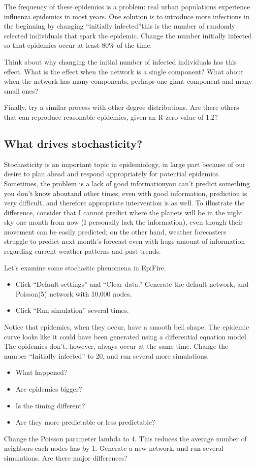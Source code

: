 \documentclass{article}
\begin{document}
The frequency of these epidemics is a problem: real urban populations experience influenza epidemics in most years.  One solution is to introduce more infections in the beginning by changing ``initially infected''\textemdash this is the number of randomly selected individuals that spark the epidemic.  Change the number initially infected so that epidemics occur at least 80\% of the time.

Think about why changing the initial number of infected individuals has this effect.  What is the effect when the network is a single component?  What about when the network has many components, perhaps one giant component and many small ones?

Finally, try a similar process with other degree distributions.  Are there others that can reproduce reasonable epidemics, given an R-zero value of 1.2?


\subsection{What drives stochasticity?}
Stochasticity is an important topic in epidemiology, in large part because of our desire to plan ahead and respond appropriately for potential epidemics.  Sometimes, the problem is a lack of good information\textemdash you can't predict something you don't know about\textemdash and other times, even with good information, prediction is very difficult, and therefore appropriate intervention is as well.  To illustrate the difference, consider that I cannot predict where the planets will be in the night sky one month from now (I personally lack the information), even though their movement can be easily predicted; on the other hand, weather forecasters struggle to predict next month's forecast even with huge amount of information regarding current weather patterns and past trends.

Let's examine some stochastic phenomena in EpiFire.
\begin{itemize}
 \item Click ``Default settings'' and ``Clear data.''  Generate the default network, and Poisson(5) network with 10,000 nodes.
 \item Click ``Run simulation'' several times.
\end{itemize}

Notice that epidemics, when they occur, have a smooth bell shape.  The epidemic curve looks like it could have been generated using a differential equation model. The epidemics don't, however, always occur at the same time. Change the number ``Initially infected'' to 20, and run several more simulations.  
\begin{itemize}

 \item What happened?  
 \item Are epidemics bigger?  
 \item Is the timing different?  
 \item Are they more predictable or less predictable?
\end{itemize}
Change the Poisson parameter lambda to 4.  This reduces the average number of neighbors each nodes has by 1.  Generate a new network, and run several simulations.  Are there major differences?
\end{document}
